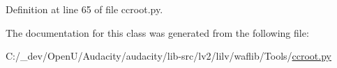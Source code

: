 Definition at line 65 of file ccroot.\+py.



The documentation for this class was generated from the following file\+:\begin{DoxyCompactItemize}
\item 
C\+:/\+\_\+dev/\+Open\+U/\+Audacity/audacity/lib-\/src/lv2/lilv/waflib/\+Tools/\hyperlink{lilv_2waflib_2_tools_2ccroot_8py}{ccroot.\+py}\end{DoxyCompactItemize}
